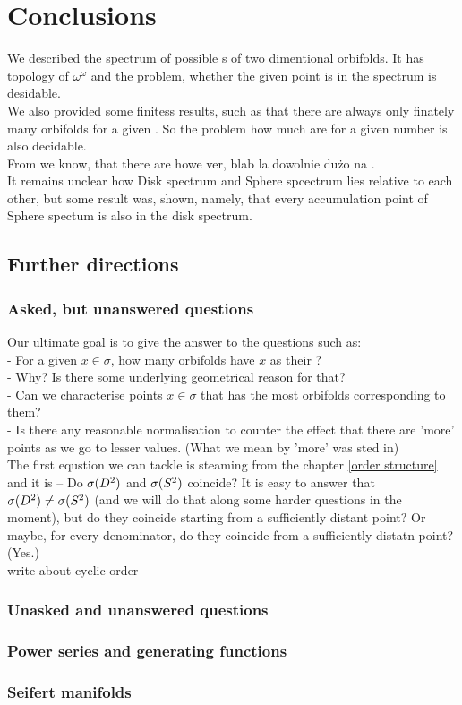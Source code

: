\chapter{Conclusions}

We described the spectrum of possible \Eoc s of two dimentional orbifolds. 
It has topology of $\omega^\omega$ and the problem, whether the given point is in the 
spectrum is desidable. \\

We also provided some finitess results, such as that there are always only finately many 
orbifolds for a given \Eoc. So the problem how much are for a given number is also decidable.\\

From  we know, that there are howe ver, blab la dowolnie dużo na \Eoc. \\

It remains unclear how Disk spectrum and Sphere spcectrum lies relative to each other, 
but some result was, shown, namely, that every accumulation point of Sphere spectum
is also in the disk spectrum. 

\section{Further directions}
\subsection{Asked, but unanswered questions}
Our ultimate goal is to give the answer to the questions such as: \\
- For a given $x \in \sigma$, how many orbifolds have $x$ as their \Eoc?\\
- Why? Is there some underlying geometrical reason for that?\\
- Can we characterise points $x \in \sigma$ that has the most orbifolds corresponding to them? \\
- Is there any reasonable normalisation to counter the effect that there are 'more' 
points as we go 
to lesser values. (What we mean by 'more' was sted in) \\
The first equstion we can tackle is steaming from the chapter \ref{order structure} 
and it is -- Do ${{\sigma}(D^2)}$ and ${{\sigma}(S^2)}$ coincide? It is easy to answer that ${{\sigma}(D^2)} \neq {{\sigma}(S^2)}$ 
(and we will do that along some harder questions in the moment), but do they coincide 
starting from a sufficiently distant point? Or maybe, for every denominator, do they coincide 
from a sufficiently distatn point? (Yes.) \\
write about cyclic order
\subsection{Unasked and unanswered questions}
\subsection{Power series and generating functions}
\subsection{Seifert manifolds}

